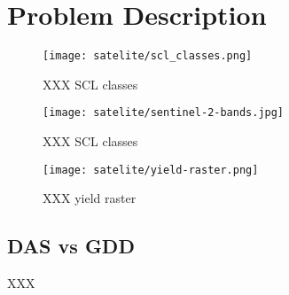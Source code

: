 \chapter{Problem Description}


\begin{figure}[h]
    \label{table:satelite/scl_classes}
    \center
    \texttt{[image: satelite/scl\_classes.png]}
    \caption{XXX SCL classes}
\end{figure}

\begin{figure}[h]
    \label{fig:satelite/sentinel-2-bands}
    \center
    \texttt{[image: satelite/sentinel-2-bands.jpg]}
    \caption{XXX SCL classes}
\end{figure}

\begin{figure}[h]
    \label{fig:satelite/yield-raster}
    \center
    \texttt{[image: satelite/yield-raster.png]}
    \caption{XXX yield raster}
\end{figure}



\section{DAS vs GDD}
XXX
